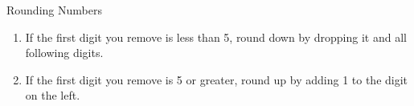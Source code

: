 \documentclass[11pt,letterpaper]{article}
\begin{document}
\begin{frame}{Rounding Numbers}
	\begin{enumerate}
		\item<1-> If the first digit you remove is less than 5, round
			down by dropping it and all following digits.
		\item<2-> If the first digit you remove is 5 or greater, round
			up by adding 1 to the digit on the left.
	\end{enumerate}

\end{frame}

\end{document}

